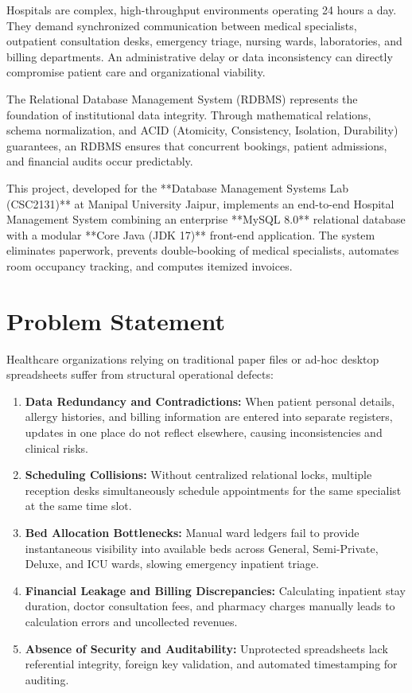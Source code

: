 \documentclass[12pt,a4paper]{article}
\begin{document}
Hospitals are complex, high-throughput environments operating 24 hours a day. They demand synchronized communication between medical specialists, outpatient consultation desks, emergency triage, nursing wards, laboratories, and billing departments. An administrative delay or data inconsistency can directly compromise patient care and organizational viability.

The Relational Database Management System (RDBMS) represents the foundation of institutional data integrity. Through mathematical relations, schema normalization, and ACID (Atomicity, Consistency, Isolation, Durability) guarantees, an RDBMS ensures that concurrent bookings, patient admissions, and financial audits occur predictably.

This project, developed for the **Database Management Systems Lab (CSC2131)** at Manipal University Jaipur, implements an end-to-end Hospital Management System combining an enterprise **MySQL 8.0** relational database with a modular **Core Java (JDK 17)** front-end application. The system eliminates paperwork, prevents double-booking of medical specialists, automates room occupancy tracking, and computes itemized invoices.

\section{Problem Statement}
\label{sec:prob}

Healthcare organizations relying on traditional paper files or ad-hoc desktop spreadsheets suffer from structural operational defects:
\begin{enumerate}
    \item \textbf{Data Redundancy and Contradictions:} When patient personal details, allergy histories, and billing information are entered into separate registers, updates in one place do not reflect elsewhere, causing inconsistencies and clinical risks.
    \item \textbf{Scheduling Collisions:} Without centralized relational locks, multiple reception desks simultaneously schedule appointments for the same specialist at the same time slot.
    \item \textbf{Bed Allocation Bottlenecks:} Manual ward ledgers fail to provide instantaneous visibility into available beds across General, Semi-Private, Deluxe, and ICU wards, slowing emergency inpatient triage.
    \item \textbf{Financial Leakage and Billing Discrepancies:} Calculating inpatient stay duration, doctor consultation fees, and pharmacy charges manually leads to calculation errors and uncollected revenues.
    \item \textbf{Absence of Security and Auditability:} Unprotected spreadsheets lack referential integrity, foreign key validation, and automated timestamping for auditing.
\end{enumerate}
\end{document}
